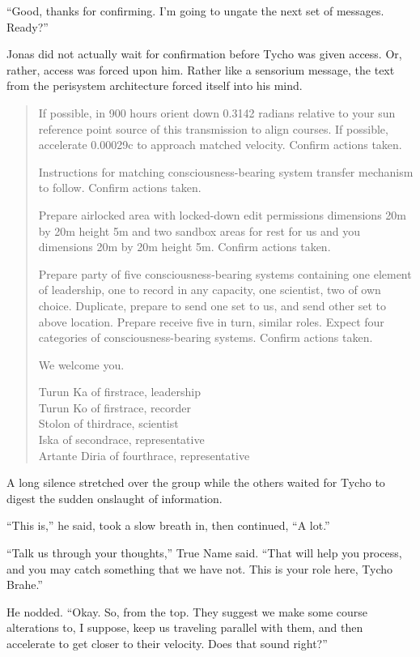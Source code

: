 ``Good, thanks for confirming. I'm going to ungate the next set of messages. Ready?''

Jonas did not actually wait for confirmation before Tycho was given access. Or, rather, access was forced upon him. Rather like a sensorium message, the text from the perisystem architecture forced itself into his mind.

\begin{quote}
If possible, in 900 hours orient down 0.3142 radians relative to your sun reference point source of this transmission to align courses. If possible, accelerate 0.00029c to approach matched velocity. Confirm actions taken.

Instructions for matching consciousness-bearing system transfer mechanism to follow. Confirm actions taken.

Prepare airlocked area with locked-down edit permissions dimensions 20m by 20m height 5m and two sandbox areas for rest for us and you dimensions 20m by 20m height 5m. Confirm actions taken.

Prepare party of five consciousness-bearing systems containing one element of leadership, one to record in any capacity, one scientist, two of own choice. Duplicate, prepare to send one set to us, and send other set to above location. Prepare receive five in turn, similar roles. Expect four categories of consciousness-bearing systems. Confirm actions taken.

We welcome you.

Turun Ka of firstrace, leadership\\
Turun Ko of firstrace, recorder\\
Stolon of thirdrace, scientist\\
Iska of secondrace, representative\\
Artante Diria of fourthrace, representative
\end{quote}

A long silence stretched over the group while the others waited for Tycho to digest the sudden onslaught of information.

``This is,'' he said, took a slow breath in, then continued, ``A lot.''

``Talk us through your thoughts,'' True Name said. ``That will help you process, and you may catch something that we have not. This is your role here, Tycho Brahe.''

He nodded. ``Okay. So, from the top. They suggest we make some course alterations to, I suppose, keep us traveling parallel with them, and then accelerate to get closer to their velocity. Does that sound right?''

